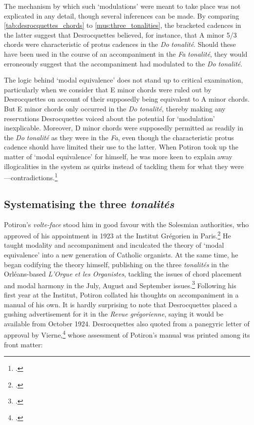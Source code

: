 The mechanism by which such `modulations' were meant to take place was not explicated in any detail, though several inferences can be made.
By comparing \cref{tab:desrocquettes_chords} to \cref{mus:three_tonalities}, the bracketed cadences in the latter suggest that Desrocquettes believed, for instance, that A minor 5/3 chords were characteristic of protus cadences in the \emph{Do} \emph{tonalité}.
Should these have been used in the course of an accompaniment in the \emph{Fa} \emph{tonalité}, they would erroneously suggest that the accompaniment had modulated to the \emph{Do} \emph{tonalité}.

The logic behind `modal equivalence' does not stand up to critical examination, particularly when we consider that E minor chords were ruled out by Desrocquettes on account of their supposedly being equivalent to A minor chords.
But E minor chords only occurred in the \emph{Do} \emph{tonalité}, thereby making any reservations Desrocquettes voiced about the potential for `modulation' inexplicable.
Moreover, D minor chords were supposedly permitted as readily in the \emph{Do} \emph{tonalité} as they were in the \emph{Fa}, even though the characteristic protus cadence should have limited their use to the latter.
When Potiron took up the matter of `modal equivalence' for himself, he was more keen to explain away illogicalities in the system as quirks instead of tackling them for what they were---contradictions.\footcite[116]{PotironTreatiseAccompanimentGregorian1933}

\subsection{Systematising the three \emph{tonalités}}
\label{hl:potiron_threetonalities}%
Potiron's \emph{volte-face} stood him in good favour with the Solesmian authorities, who approved of his appointment in 1923 at the Institut Grégorien in Paris.\footcite[194]{BrunInstitutgregorienParis1923}
He taught modality and accompaniment and inculcated the theory of `modal equivalence' into a new generation of Catholic organists.
At the same time, he began codifying the theory himself, publishing on the three \emph{tonalités} in the Orléans-based \covid{}\emph{L'Orgue et les Organistes}, tackling the issues of chord placement and modal harmony in the July, August and September issues.\footcite[p.~5 n.~1]{Potirontheorieharmoniquetrois1926}
Following his first year at the Institut, Potiron collated his thoughts on accompaniment in a manual of his own.
It is hardly surprising to note that Desrocquettes placed a gushing advertisement for it in the \emph{Revue grégorienne}, saying it would be available from October 1924.
Desrocquettes also quoted from a panegyric letter of approval by Vierne,\footcite[pp. 154, 156]{DesrocquettesCoursaccompagnementInstitut1924} whose assessment of Potiron's manual was printed among its front matter:

